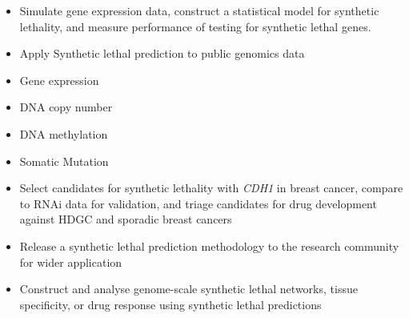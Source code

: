 \begin{itemize}

\item 

Simulate gene expression data, construct a statistical model for
synthetic lethality, and measure performance of testing for synthetic
lethal genes. 

\item 

Apply Synthetic lethal prediction to public genomics data



\item 

Gene expression

\item 

DNA copy number

\item 

DNA methylation

\item 

Somatic Mutation

\item 

Select candidates for synthetic lethality with \textit{CDH1} in breast cancer,
compare to RNAi data for validation, and triage candidates for drug
development against HDGC and sporadic breast cancers

\item 

Release a synthetic lethal prediction methodology to the research
community for wider application 

\item 

Construct and analyse genome-scale synthetic lethal networks, tissue
specificity, or drug response using synthetic lethal predictions

\end{itemize}

